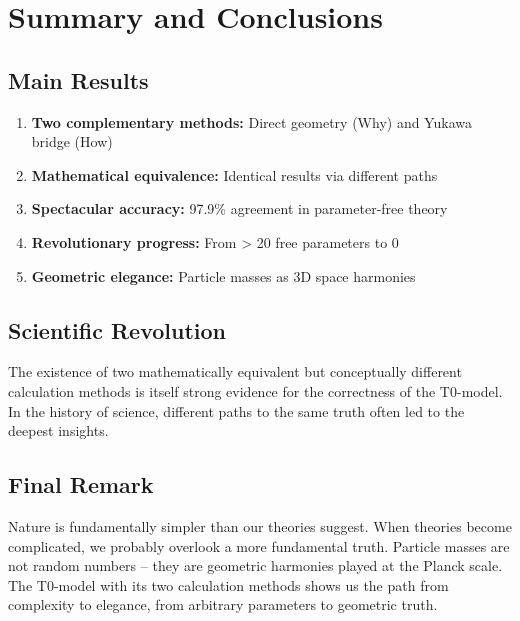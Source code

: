 \documentclass[12pt,a4paper]{article}
\begin{document}
	\section{Summary and Conclusions}
	\label{sec:summary_conclusions}
	
	\subsection{Main Results}
	\label{subsec:main_results}
	
	\begin{enumerate}
		\item \textbf{Two complementary methods:} Direct geometry (Why) and Yukawa bridge (How)
		\item \textbf{Mathematical equivalence:} Identical results via different paths
		\item \textbf{Spectacular accuracy:} 97.9\% agreement in parameter-free theory
		\item \textbf{Revolutionary progress:} From > 20 free parameters to 0
		\item \textbf{Geometric elegance:} Particle masses as 3D space harmonies
	\end{enumerate}
	
	\subsection{Scientific Revolution}
	\label{subsec:scientific_revolution}
	
	The existence of two mathematically equivalent but conceptually different calculation methods is itself strong evidence for the correctness of the T0-model. In the history of science, different paths to the same truth often led to the deepest insights.
	
	\subsection{Final Remark}
	\label{subsec:final_remark}
	
	Nature is fundamentally simpler than our theories suggest. When theories become complicated, we probably overlook a more fundamental truth. Particle masses are not random numbers -- they are geometric harmonies played at the Planck scale. The T0-model with its two calculation methods shows us the path from complexity to elegance, from arbitrary parameters to geometric truth.
	
\end{document}
